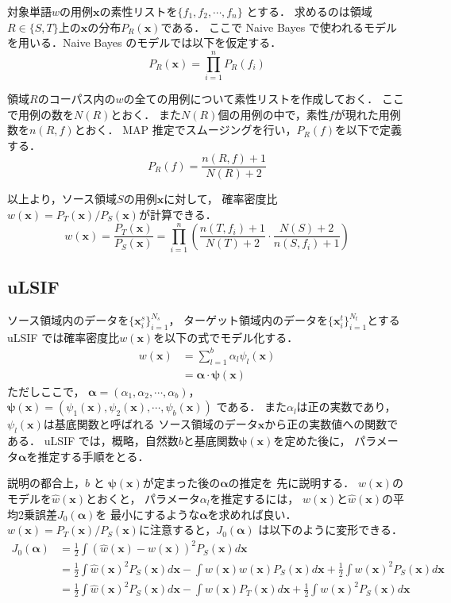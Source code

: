 \documentclass[japanese]{jnlp_1.4}
\begin{document}
対象単語$w$の用例${\bm x}$の素性リストを$\{ f_1,f_2,\cdots, f_n \}$ とする．
求めるのは領域$R \in \{S, T\}$上の${\bm x}$の分布$P_R ({\bm x})$である．
ここで Naive Bayes で使われるモデルを用いる．Naive Bayes のモデルでは以下を仮定する．
\[
P_R ({\bm x}) = \prod_{i=1}^{n} P_R (f_i) 
\]

領域$R$のコーパス内の$w$の全ての用例について素性リストを作成しておく．
ここで用例の数を$N(R)$とおく．
また$N(R)$個の用例の中で，素性$f$が現れた用例数を$n(R,f)$とおく．
MAP 推定でスムージングを行い，$P_R (f)$を以下で定義する\cite{takamura}．
\[
P_R (f) = \frac{n(R,f) + 1}{N(R) + 2}
\]

以上より，ソース領域$S$の用例${\bm x}$に対して，
確率密度比$w({\bm x}) = P_T ({\bm x})/P_S ({\bm x})$が計算できる．
\[
w({\bm x}) = \frac{P_T ({\bm x})}{P_S ({\bm x})} = \prod_{i=1}^n \left( \frac{n(T,f_i) + 1}{N(T) + 2}\cdot\frac{N(S) + 2}{n(S,f_i) + 1} \right)
\]


\subsection{uLSIF}

ソース領域内のデータを$\{{\bm x_i^s}\}_{i=1}^{N_s}$，
ターゲット領域内のデータを$\{{\bm x_i^t}\}_{i=1}^{N_t}$とする
uLSIF では確率密度比$w({\bm x})$を以下の式でモデル化する．
\begin{align*}
w({\bm x}) & = \sum_{l = 1}^b \alpha_l \psi_l ({\bm x}) \\
           & = {\bm \alpha}\cdot {\bm \psi}({\bm x})
\end{align*}
ただしここで，
$
{\bm \alpha} = (\alpha_1, \alpha_2, \cdots, \alpha_b) 
$，
$
{\bm \psi}({\bm x}) = (\psi_1 ({\bm x}), \psi_2 ({\bm x}), \cdots, \psi_b ({\bm x})) 
$ である．
また$\alpha_l$は正の実数であり，$\psi_l ({\bm x})$は基底関数と呼ばれる
ソース領域のデータ${\bm x}$から正の実数値への関数である．
uLSIF では，概略，自然数$b$と基底関数${\bm \psi}({\bm x}) $を定めた後に，
パラメータ${\bm \alpha}$を推定する手順をとる．

説明の都合上，$b$ と ${\bm \psi}({\bm x})$が定まった後の${\bm \alpha}$の推定を
先に説明する．
$w({\bm x})$のモデルを$\hat{w}({\bm x})$とおくと，
パラメータ$\alpha_l$を推定するには，
$w({\bm x})$と$\hat{w}({\bm x})$の平均2乗誤差$J_0({\bm \alpha})$を
最小にするような${\bm \alpha}$を求めれば良い．
$w({\bm x}) = P_T ({\bm x})/P_S ({\bm x})$に注意すると，$J_0({\bm \alpha})$
は以下のように変形できる．
\begin{align*}
J_0({\bm \alpha}) & = \frac{1}{2} \int (\hat{w}({\bm x})  - w({\bm x}))^2 P_S({\bm x}) d{\bm x} \\
 & = \frac{1}{2} \int \hat{w}({\bm x})^2 P_S({\bm x}) d{\bm x}
	- \int \hat{w}({\bm x}) w({\bm x}) P_S({\bm x}) d{\bm x}
	+ \frac{1}{2} \int w({\bm x})^2 P_S({\bm x}) d{\bm x} \\
 & = \frac{1}{2} \int \hat{w}({\bm x})^2 P_S({\bm x})  d{\bm x}
	- \int \hat{w}({\bm x}) P_T({\bm x}) d{\bm x}
  + \frac{1}{2} \int w({\bm x})^2 P_S({\bm x}) d{\bm x} 
\end{align*}
\end{document}
